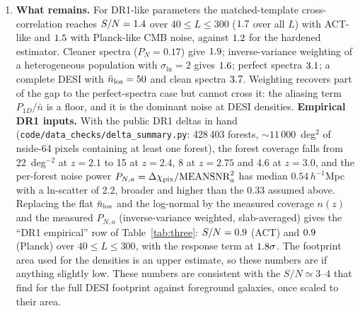 \documentclass[11pt,a4paper]{article}
\begin{document}
\begin{enumerate}
\item \textbf{What remains.} For DR1-like parameters the matched-template cross-correlation reaches $S/N=1.4$ over $40\le L\le300$ ($1.7$ over all $L$) with ACT-like and $1.5$ with Planck-like CMB noise, against $1.2$ for the hardened estimator. Cleaner spectra ($P_N=0.17$) give $1.9$; inverse-variance weighting of a heterogeneous population with $\sigma_{\ln}=2$ gives $1.6$; perfect spectra $3.1$; a complete DESI with $\bar n_{\rm los}=50$ and clean spectra $3.7$. Weighting recovers part of the gap to the perfect-spectra case but cannot cross it: the aliasing term $P_{1D}/\bar n$ is a floor, and it is the dominant noise at DESI densities. \textbf{Empirical DR1 inputs.} With the public DR1 deltas in hand (\texttt{code/data\_checks/delta\_summary.py}: 428\,403 forests, $\sim11\,000$~deg$^2$ of nside-64 pixels containing at least one forest), the forest coverage falls from 22~deg$^{-2}$ at $z=2.1$ to 15 at $z=2.4$, 8 at $z=2.75$ and 4.6 at $z=3.0$, and the per-forest noise power $P_{N,a}=\Delta\chi_{\rm pix}/{\rm MEANSNR}_a^2$ has median $0.54\,h^{-1}$Mpc with a ln-scatter of 2.2, broader and higher than the $0.33$ assumed above. Replacing the flat $\bar n_{\rm los}$ and the log-normal by the measured coverage $n(z)$ and the measured $P_{N,a}$ (inverse-variance weighted, slab-averaged) gives the ``DR1 empirical'' row of Table~\ref{tab:three}: $S/N=0.9$ (ACT) and $0.9$ (Planck) over $40\le L\le300$, with the response term at $1.8\sigma$. The footprint area used for the densities is an upper estimate, so these numbers are if anything slightly low. These numbers are consistent with the $S/N\simeq3$--4 that \citet{2410.20014} find for the full DESI footprint against foreground galaxies, once scaled to their area.
\end{enumerate}
\end{document}
